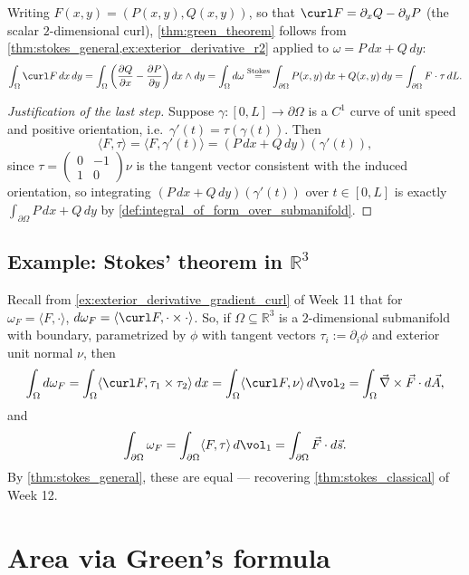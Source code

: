 Writing $F(x,y) = (P(x,y),Q(x,y))$, so that $\curl F = \partial_xQ - \partial_yP$ (the scalar
$2$-dimensional curl), \cref{thm:green_theorem} follows from
\cref{thm:stokes_general,ex:exterior_derivative_r2} applied to $\omega = P\,dx+Q\,dy$:
\[
\int_\Omega \curl F\,dx\,dy = \int_\Omega \left(\frac{\partial Q}{\partial x} -
  \frac{\partial P}{\partial y}\right) dx\wedge dy = \int_\Omega d\omega
  \overset{\text{Stokes}}{=} \int_{\partial\Omega} P(x,y)\,dx + Q(x,y)\,dy
  = \int_{\partial\Omega} F\cdot\tau\,dL.
\]

\begin{proof}[Justification of the last step]
Suppose $\gamma : [0,L] \to \partial\Omega$ is a $C^1$ curve of unit speed and positive
orientation, i.e.\ $\gamma'(t) = \tau(\gamma(t))$. Then
\[\langle F,\tau\rangle = \langle F,\gamma'(t)\rangle = (P\,dx+Q\,dy)(\gamma'(t)),\]
since $\tau = \begin{pmatrix}0&-1\\1&0\end{pmatrix}\nu$ is the tangent vector consistent with
the induced orientation, so integrating $(P\,dx+Q\,dy)(\gamma'(t))$ over $t \in [0,L]$ is
exactly $\int_{\partial\Omega} P\,dx+Q\,dy$ by \cref{def:integral_of_form_over_submanifold}.
\end{proof}

\subsection{Example: Stokes' theorem in \texorpdfstring{$\mathbb{R}^3$}{R\^{}3}}
\label{sec:stokes_in_r3}

Recall from \cref{ex:exterior_derivative_gradient_curl} of Week 11 that for $\omega_F =
\langle F,\cdot\rangle$, $d\omega_F = \langle\curl F,\cdot\times\cdot\rangle$. So, if $\Omega
\subseteq \mathbb{R}^3$ is a $2$-dimensional submanifold with boundary, parametrized by $\phi$
with tangent vectors $\tau_i := \partial_i\phi$ and exterior unit normal $\nu$, then
\[
\int_\Omega d\omega_F = \int_\Omega \langle\curl F,\tau_1\times\tau_2\rangle\,dx
  = \int_\Omega \langle\curl F,\nu\rangle\,d\vol_2 = \int_\Omega \vec\nabla\times\vec F\cdot
  d\vec A,
\]
and
\[\int_{\partial\Omega} \omega_F = \int_{\partial\Omega} \langle F,\tau\rangle\,d\vol_1
  = \int_{\partial\Omega} \vec F\cdot d\vec s.\]
By \cref{thm:stokes_general}, these are equal --- recovering \cref{thm:stokes_classical} of
Week 12.

\section{Area via Green's formula}
\label{sec:area_via_green}

